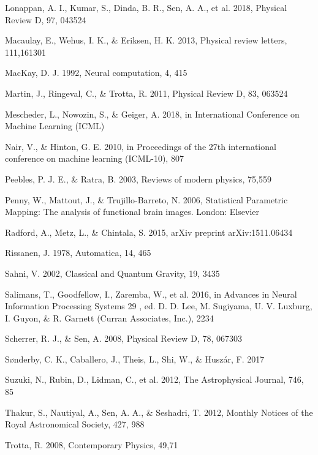 \documentclass[10pt]{article}
\begin{document}
Lonappan, A. I., Kumar, S., Dinda, B. R., Sen, A. A., et al. 2018, Physical Review D, 97, 043524

Macaulay, E., Wehus, I. K., \& Eriksen, H. K. 2013, Physical review letters, 111,161301

MacKay, D. J. 1992, Neural computation, 4, 415

Martin, J., Ringeval, C., \& Trotta, R. 2011, Physical Review D, 83, 063524

Mescheder, L., Nowozin, S., \& Geiger, A. 2018, in International Conference on Machine Learning (ICML)

Nair, V., \& Hinton, G. E. 2010, in Proceedings of the 27th international conference on machine learning (ICML-10), 807

Peebles, P. J. E., \& Ratra, B. 2003, Reviews of modern physics, 75,559

Penny, W., Mattout, J., \& Trujillo-Barreto, N. 2006, Statistical Parametric Mapping: The analysis of functional brain images. London: Elsevier

Radford, A., Metz, L., \& Chintala, S. 2015, arXiv preprint arXiv:1511.06434

Rissanen, J. 1978, Automatica, 14, 465

Sahni, V. 2002, Classical and Quantum Gravity, 19, 3435

Salimans, T., Goodfellow, I., Zaremba, W., et al. 2016, in Advances in Neural Information Processing Systems 29 , ed. D. D. Lee, M. Sugiyama, U. V. Luxburg, I. Guyon, \& R. Garnett (Curran Associates, Inc.), 2234

Scherrer, R. J., \& Sen, A. 2008, Physical Review D, 78, 067303

Sønderby, C. K., Caballero, J., Theis, L., Shi, W., \& Huszár, F. 2017

Suzuki, N., Rubin, D., Lidman, C., et al. 2012, The Astrophysical Journal, 746, 85

Thakur, S., Nautiyal, A., Sen, A. A., \& Seshadri, T. 2012, Monthly Notices of the Royal Astronomical Society, 427, 988

Trotta, R. 2008, Contemporary Physics, 49,71
\end{document}
